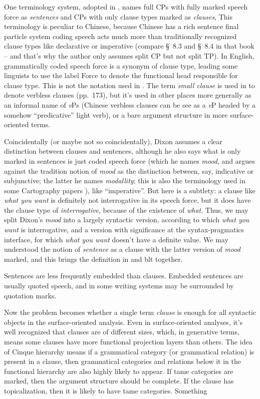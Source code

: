 \documentclass[UTF8, a4paper, oneside, scheme=plain]{ctexart}
\newcommand*{\citesec}[1]{\S~{#1}}
\newcommand*{\citepage}[1]{pp.~{#1}}
\newcommand*{\term}[1]{\emph{#1}}
\newcommand*{\corpus}[1]{\emph{#1}}
\newcommand*{\vP}{\textit{v}P}
\begin{document}
One terminology system, 
adopted in \citep[\citepage{140}]{deng2010formal},
names full CPs with fully marked speech force as \term{sentences} 
and CPs with only clause types marked as \term{clauses},
This terminology is peculiar to Chinese,
because Chinese has a rich sentence final particle system 
coding speech acts much more than traditionally recognized clause types like declarative or imperative
(compare \citesec{8.3} and \citesec{8.4} in that book 
-- and that's why the author only assumes split CP but not split TP).
In English, grammatically coded speech force is a synonym of clause type,
leading some linguists to use the label Force to denote the functional head responsible for clause type.
This is not the notation used in \citet[\citepage{142}]{deng2010formal}.
The term \term{small clause} is used in \citet{deng2010formal} 
to denote verbless clauses (\citepage{173}),
but it's used in other places more generally as an informal name of \vP s
(Chinese verbless clauses can be see as a \vP{} headed by a somehow ``predicative'' light verb),
or a bare argument structure in more surface-oriented terms.

Coincidentally (or maybe not so coincidentally),
Dixon assumes a clear distinction between clauses and sentences,
although he also says what is only marked in sentences 
is just coded speech force 
(which he names \term{mood}, 
and argues against the tradition notion of \term{mood} as the distinction between, 
say, indicative or subjunctive;
the latter he names \term{modallity};
this is also the terminology used in some Cartography papers \citep{rizzi2016functional}),
like ``imperative''.
But here is a subtlety:
a clause like \corpus{what you want} is definitely not interrogative in its speech force,
but it does have the clause type of \term{interrogative},
because of the existence of \corpus{what}.
Thus, we may split Dixon's \term{mood} into a largely syntactic version,
according to which \corpus{what you want} is interrogative,
and a version with significance at the syntax-pragmatics interface,
for which \corpus{what you want} doesn't have a definite value.
We may understood the notion of \term{sentence} as a clause 
with the latter version of \term{mood} marked,
and this brings the definition in \citet{deng2010formal} and \ac{blt} together.

Sentences are less frequently embedded than clauses.
Embedded sentences are usually quoted speech,
and in some writing systems may be surrounded by quotation marks.

Now the problem becomes whether a single term \term{clause} is enough 
for all syntactic objects in the surface-oriented analysis.
Even in surface-oriented analyses,
it's well recognized that clauses are of different sizes,
which, in generative terms, 
means some clauses have more functional projection layers than others.
The idea of Cinque hierarchy means if a grammatical category (or grammatical relation)
is present in a clause,
then grammatical categories and relations below it in the functional hierarchy 
are also highly likely to appear.
If \ac{tame} categories are marked,
then the argument structure should be complete.
If the clause has topicalization,
then it is likely to have \ac{tame} categories.
Something 
\end{document}
